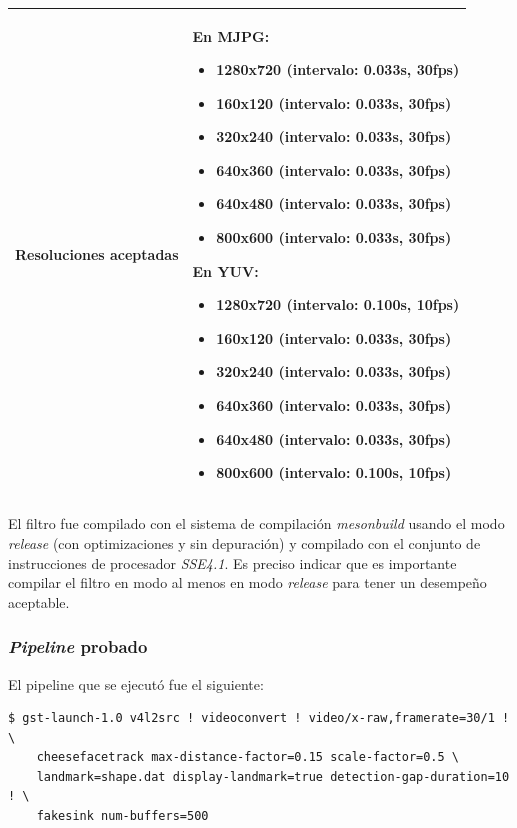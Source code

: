 \documentclass[a4paper,openright,12pt]{report}
\begin{document}
\begin{center}
\begin{longtable}{| p{} | p{} |}
    Resoluciones aceptadas &
    En MJPG:
      \begin{itemize}
        \item 1280x720 (intervalo: 0.033s, 30fps)
        \item 160x120 (intervalo: 0.033s, 30fps)
        \item 320x240 (intervalo: 0.033s, 30fps)
        \item 640x360 (intervalo: 0.033s, 30fps)
        \item 640x480 (intervalo: 0.033s, 30fps)
        \item 800x600 (intervalo: 0.033s, 30fps)
      \end{itemize}
    En YUV:
      \begin{itemize}
        \item 1280x720 (intervalo: 0.100s, 10fps)
        \item 160x120 (intervalo: 0.033s, 30fps)
        \item 320x240 (intervalo: 0.033s, 30fps)
        \item 640x360 (intervalo: 0.033s, 30fps)
        \item 640x480 (intervalo: 0.033s, 30fps)
        \item 800x600 (intervalo: 0.100s, 10fps)
      \end{itemize}
    \\ \hline
    \end{longtable}
  \end{center}

El filtro fue compilado con el sistema de compilación \textit{mesonbuild}
usando el modo \textit{release} (con optimizaciones y sin depuración) y
compilado con el conjunto de instrucciones de procesador \textit{SSE4.1}. Es
preciso indicar que es importante compilar el filtro en modo al menos en modo
\textit{release} para tener un desempeño aceptable.\\

\subsubsection{\textit{Pipeline} probado}
El pipeline que se ejecutó fue el siguiente:
\begin{verbatim}
$ gst-launch-1.0 v4l2src ! videoconvert ! video/x-raw,framerate=30/1 ! \
    cheesefacetrack max-distance-factor=0.15 scale-factor=0.5 \
    landmark=shape.dat display-landmark=true detection-gap-duration=10 ! \
    fakesink num-buffers=500
\end{verbatim}
\end{document}
